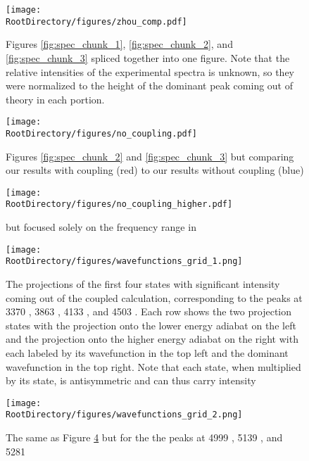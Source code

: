 \begin{figure}[ht]
\begin{center}
    \texttt{[image: \\RootDirectory/figures/zhou\_comp.pdf]}
    \caption{
    Figures \ref{fig:spec_chunk_1}, \ref{fig:spec_chunk_2}, and \ref{fig:spec_chunk_3} spliced together into one figure. Note that the relative intensities of the experimental spectra is unknown, so they were normalized to the height of the dominant peak coming out of theory in each portion.
}
\label{fig:zhou_comp}
\end{center}
\end{figure}

\begin{figure}[ht]
\begin{center}
    \texttt{[image: \\RootDirectory/figures/no\_coupling.pdf]}
    \caption{
    Figures \ref{fig:spec_chunk_2} and \ref{fig:spec_chunk_3} but comparing our results with coupling (red) to our results without coupling (blue)
}
\label{fig:no_coupling}
\end{center}
\end{figure}

\begin{figure}[ht]
\begin{center}
    \texttt{[image: \\RootDirectory/figures/no\_coupling\_higher.pdf]}
    \caption{
     but focused solely on the frequency range in 
}
\label{fig:no_coupling_higher}
\end{center}
\end{figure}

\begin{figure}[ht]
\begin{center}
    \texttt{[image: \\RootDirectory/figures/wavefunctions\_grid\_1.png]}
    \caption{
    The projections of the first four states with significant intensity coming out of the coupled calculation, corresponding to the peaks at 3370 \wavenumbers{}, 3863 \wavenumbers{}, 4133 \wavenumbers{}, and 4503 \wavenumbers{}. \LOL  Each row shows the two projection states with the projection onto the lower energy adiabat on the left and the projection onto the higher energy adiabat on the right with each labeled by its \htwo{} wavefunction in the top left and the dominant \hplus{} wavefunction in the top right. Note that each state, when multiplied by its \htwo{} state, is antisymmetric and can thus carry intensity }
\label{fig:wavefunctions_grid_1}
\end{center}
\end{figure}

\begin{figure}[ht]
\begin{center}
    \texttt{[image: \\RootDirectory/figures/wavefunctions\_grid\_2.png]}
    \caption{ The same as Figure \ref{fig:wavefunctions_grid_1} but for the the peaks at 4999 \wavenumbers{}, 5139 \wavenumbers{}, and 5281 \wavenumbers{}}
\label{fig:wavefunctions_grid_2}
\end{center}
\end{figure}

%
